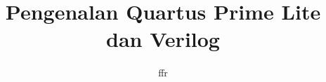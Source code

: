 \documentclass[a4paper,11pt,bahasa]{extarticle}
\begin{document}
\title{Pengenalan Quartus Prime Lite dan Verilog}
\author{ffr}
\date{}
\maketitle

\tableofcontents












\appendix


\end{document}

